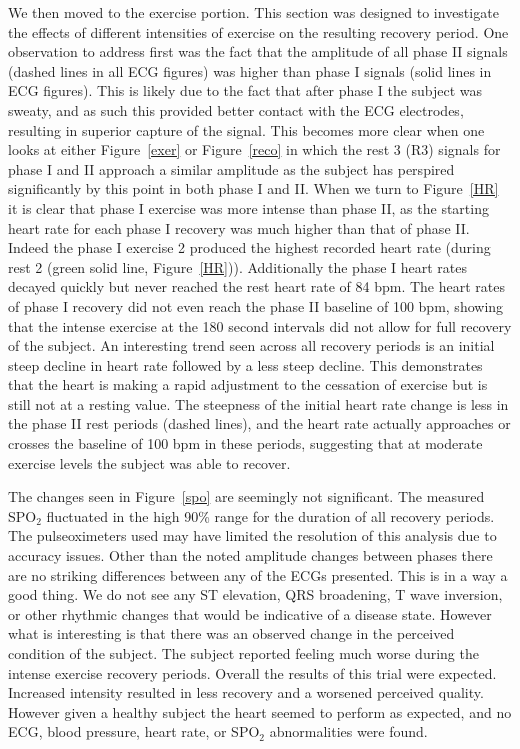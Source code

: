 \documentclass[12pt]{article}
\newcommand{\spo}{{SPO$_2$}}
\begin{document}
We then moved to the exercise portion. This section was designed to investigate the effects of different intensities of exercise on the resulting recovery period. One observation to address first was the fact that the amplitude of all phase II signals (dashed lines in all ECG figures) was higher than phase I signals (solid lines in ECG figures). This is likely due to the fact that after phase I the subject was sweaty, and as such this provided better contact with the ECG electrodes, resulting in superior capture of the signal. This becomes more clear when one looks at either Figure~\ref{exer} or Figure~\ref{reco} in which the rest 3 (R3) signals for phase I and II approach a similar amplitude as the subject has perspired significantly by this point in both phase I and II. When we turn to Figure~\ref{HR} it is clear that phase I exercise was more intense than phase II, as the starting heart rate for each phase I recovery was much higher than that of phase II. Indeed the phase I exercise 2 produced the highest recorded heart rate (during rest 2 (green solid line, Figure~\ref{HR})). Additionally the phase I heart rates decayed quickly but never reached the rest heart rate of 84 bpm. The heart rates of phase I recovery did not even reach the phase II baseline of 100 bpm, showing that the intense exercise at the 180 second intervals did not allow for full recovery of the subject. An interesting trend seen across all recovery periods is an initial steep decline in heart rate followed by a less steep decline. This demonstrates that the heart is making a rapid adjustment to the cessation of exercise but is still not at a resting value. The steepness of the initial heart rate change is less in the phase II rest periods (dashed lines), and the heart rate actually approaches or crosses the baseline of 100 bpm in these periods, suggesting that at moderate exercise levels the subject was able to recover.

The changes seen in Figure~\ref{spo} are seemingly not significant. The measured \spo{} fluctuated in the high 90\% range for the duration of all recovery periods. The pulseoximeters used may have limited the resolution of this analysis due to accuracy issues. Other than the noted amplitude changes between phases there are no striking differences between any of the ECGs presented. This is in a way a good thing. We do not see any ST elevation, QRS broadening, T wave inversion, or other rhythmic changes that would be indicative of a disease state. However what is interesting is that there was an observed change in the perceived condition of the subject. The subject reported feeling much worse during the intense exercise recovery periods. Overall the results of this trial were expected. Increased intensity resulted in less recovery and a worsened perceived quality. However given a healthy subject the heart seemed to perform as expected, and no ECG, blood pressure, heart rate, or \spo{} abnormalities were found.



\end{document}
